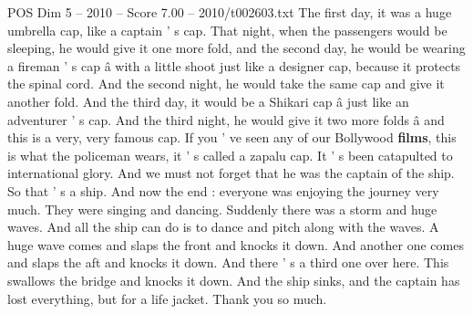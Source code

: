 \begin{textsample}{POS Dim 5 – 2010 – Score 7.00 – 2010/t002603.txt}
The first day, it was a huge umbrella cap, like a captain ' s cap.
That night, when the passengers would be sleeping, he would give it one more fold, and the second day, he would be wearing a fireman ' s cap â with a little shoot just like a designer cap, because it protects the spinal cord.
And the second night, he would take the same cap and give it another fold.
And the third day, it would be a Shikari cap â just like an adventurer ' s cap.
And the third night, he would give it two more folds â and this is a very, very famous cap.
If you ' ve seen any of our Bollywood \textbf{films}, this is what the policeman wears, it ' s called a zapalu cap.
It ' s been catapulted to international glory.
And we must not forget that he was the captain of the ship.
So that ' s a ship.
And now the end : everyone was enjoying the journey very much.
They were singing and dancing.
Suddenly there was a storm and huge waves.
And all the ship can do is to dance and pitch along with the waves.
A huge wave comes and slaps the front and knocks it down.
And another one comes and slaps the aft and knocks it down.
And there ' s a third one over here.
This swallows the bridge and knocks it down.
And the ship sinks, and the captain has lost everything, but for a life jacket.
Thank you so much.

\end{textsample}
